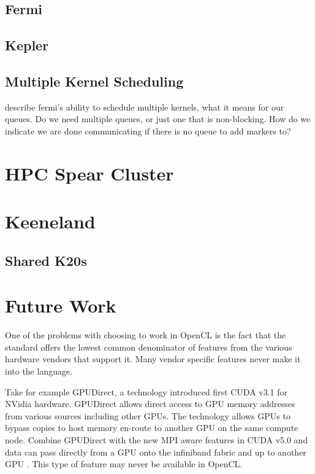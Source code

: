 \documentclass{report}
\begin{document}
\subsection{Fermi}
\subsection{Kepler}
\subsection{Multiple Kernel Scheduling}
describe fermi's ability to schedule multiple kernels, what it means for our queues. Do we need multiple queues, or just one that is non-blocking. How do we indicate we are done communicating if there is no queue to add markers to? 


\section{HPC Spear Cluster} 

\section{Keeneland}

\subsection{Shared K20s}



\section{Future Work}

One of the problems with choosing to work in OpenCL is the fact that the standard offers the lowest common denominator of features from the various hardware vendors that support it. Many vendor specific features never make it into the language. 

Take for example GPUDirect, a technology introduced first CUDA v3.1 for NVidia hardware. GPUDirect allows direct access to GPU memory addresses from various sources including other GPUs. The technology allows GPUs to bypass copies to host memory en-route to another GPU on the same compute node. Combine GPUDirect with the new MPI aware features in CUDA v5.0 and data can pass directly from a GPU onto the infiniband fabric and up to another GPU \cite{NvidiaGPUMPI}. This type of feature may never be available in OpenCL. 




\ifstandalone


\end{document}
